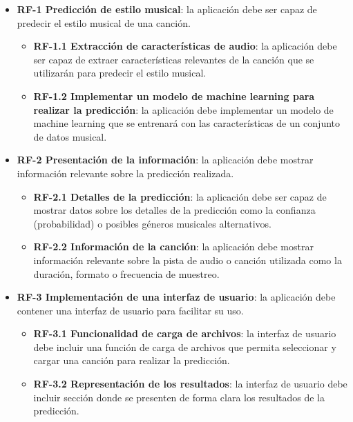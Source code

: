 \begin{itemize}
\tightlist

\item \textbf{RF-1 Predicción de estilo musical}: la aplicación debe ser capaz de predecir el estilo musical de una canción.
	\begin{itemize}
	\tightlist
	\item \textbf{RF-1.1 Extracción de características de audio}: la aplicación debe ser capaz de extraer características relevantes de la canción que se utilizarán para predecir el estilo musical.

	\item \textbf{RF-1.2 Implementar un modelo de machine learning para realizar la predicción}: la aplicación debe implementar un modelo de machine learning que se entrenará con las características de un conjunto de datos musical.
	\end{itemize}

\item \textbf{RF-2 Presentación de la información}: la aplicación debe mostrar información relevante sobre la predicción realizada.
	\begin{itemize}
	\tightlist
	\item \textbf{RF-2.1 Detalles de la predicción}: la aplicación debe ser capaz de mostrar datos sobre los detalles de la predicción como la confianza (probabilidad) o posibles géneros musicales alternativos.

	\item \textbf{RF-2.2 Información de la canción}: la aplicación debe mostrar información relevante sobre la pista de audio o canción utilizada como la duración, formato o frecuencia de muestreo.
	\end{itemize}
\item \textbf{RF-3 Implementación de una interfaz de usuario}: la aplicación debe contener una interfaz de usuario para facilitar su uso.
	\begin{itemize}
	\tightlist
	\item \textbf{RF-3.1 Funcionalidad de carga de archivos}: la interfaz de usuario debe incluir una función de carga de archivos que permita seleccionar y cargar una canción para realizar la predicción.

	\item \textbf{RF-3.2 Representación de los resultados}: la interfaz de usuario debe incluir sección donde se presenten de forma clara los resultados de la predicción.
	\end{itemize}

\end{itemize}
